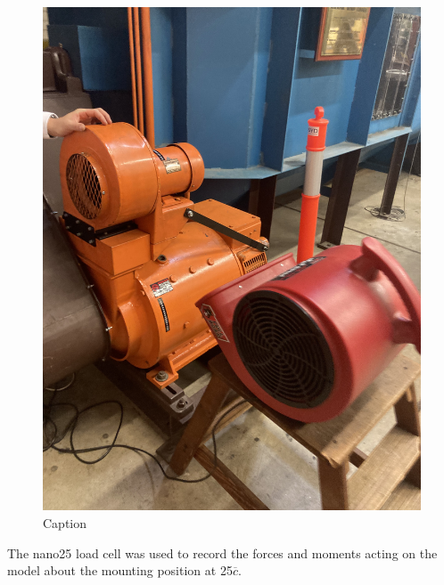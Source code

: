 \begin{figure}[!ht]
    \centering
    \includegraphics[scale=0.1]{04_Methodology/Figs/cooler.jpg}
    \caption{Caption}
    \label{fig:engineCooler}
\end{figure}

The nano25 load cell was used to record the forces and moments acting on the model about the mounting position at 25$\overline{c}$. 

